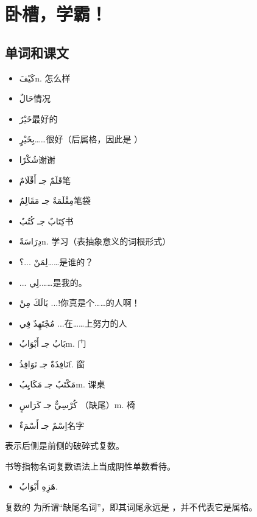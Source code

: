 \chapter{卧槽，学霸！}

\section{单词和课文}

\begin{itemize}
    \item \ac{كَيْفَ}{n. 怎么样}
    \item \ac{حَالٌ}{情况}
    \item \ac{خَيْرٌ}{最好的}
    \item \ac{بِخَيْرٍ}{……很好（后属格，因此是 ）}
    \item \ac{شُكْرًا}{谢谢}
    \item \ac{قَلَمٌ جـ أَقْلَامٌ}{笔}
    \item \ac{مِقْلَمَةٌ جـ مَقَالِمُ}{笔袋}
    \item \ac{كِتَابٌ جـ كُتُبٌ}{书}
    \item \ac{دِرَاسَةٌ}{n. 学习（表抽象意义的词根形式）}
    \item \ac{لِمَنْ ...؟}{……是谁的？}
    \item \ac{... لِي.}{……是我的。}
    \item \ac{يَالَكَ مِنْ ...!}{你真是个……的人啊！}
    \item \ac{مُجْتَهِدٌ فِي ...}{在……上努力的人}
    \item \ac{بَابٌ جـ أَبْوَابٌ}{m. 门}
    \item \ac{نَافِذَةٌ جـ نَوَافِذُ}{f. 窗}
    \item \ac{مَكْتَبٌ جـ مَكَايِبُ}{m. 课桌}
    \item \ac{كُرْسِيٌّ جـ كَرَاسٍ }{（缺尾）m. 椅}
    \item \ac{اِسْمٌ جـ أَسْمَءٌ}{名字}
\end{itemize}

表示后侧是前侧的破碎式复数。

书等指物名词复数语法上当成阴性单数看待。

\begin{Arabic}
    \begin{itemize}
        \item هَزِهِ أَبْوَابٌ.
    \end{itemize}
\end{Arabic}

复数的 为所谓``缺尾名词''，即其词尾永远是 ，并不代表它是属格。

